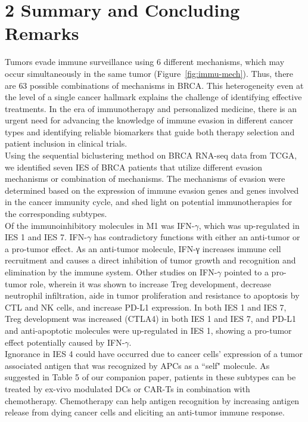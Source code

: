 \documentclass[a4paper, 11pt]{article}
\begin{document}
\section*{2 Summary and Concluding Remarks}
Tumors evade immune surveillance using $6$ different mechanisms, which may occur simultaneously in the same tumor (Figure~\ref{fig:immu-mech}). Thus, there are $63$ possible combinations of mechanisms in BRCA. This heterogeneity even at the level of a single cancer hallmark explains the challenge of identifying effective treatments. In the era of immunotherapy and personalized medicine, there is an urgent need for advancing the knowledge of immune evasion in different cancer types and identifying reliable biomarkers that guide both therapy selection and patient inclusion in clinical trials.\\
Using the sequential biclustering method on BRCA RNA-seq data from TCGA, we identified seven IES of BRCA patients that utilize different evasion mechanisms or combination of mechanisms. The mechanisms of evasion were determined based on the expression of immune evasion genes and genes involved in the cancer immunity cycle, and shed light on potential immunotherapies for the corresponding subtypes.\\ 
Of the immunoinhibitory molecules in M1 was IFN-$\gamma$, which was up-regulated in IES 1 and IES 7. IFN-$\gamma$ has contradictory functions with either an anti-tumor or a pro-tumor effect. As an anti-tumor molecule, IFN-γ increases immune cell recruitment and causes a direct inhibition of tumor growth and recognition and elimination by the immune system. Other studies on IFN-$\gamma$ pointed to a pro-tumor role, wherein it was shown to increase Treg development, decrease neutrophil infiltration, aide in tumor proliferation and resistance to apoptosis by CTL and NK cells, and increase PD-L1 expression. In both IES 1 and IES 7, Treg development was increased (CTLA4) in both IES 1 and IES 7, and PD-L1 and anti-apoptotic molecules were up-regulated in IES 1, showing a pro-tumor effect potentially caused by IFN-$\gamma$.\\
Ignorance in IES 4 could have occurred due to cancer cells’ expression of a tumor associated antigen that was recognized by APCs as a ``self" molecule. As suggested in Table 5 of our companion paper, patients in these subtypes can be treated by ex-vivo modulated DCs or CAR-Ts in combination with chemotherapy. Chemotherapy can help antigen recognition by increasing antigen release from dying cancer cells and eliciting an anti-tumor immune response.\\
\end{document}
